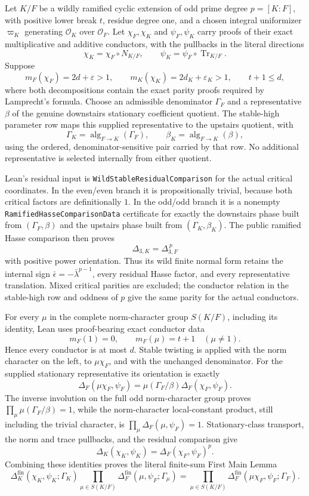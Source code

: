 \begin{theorem}\label{mod:cases-wildstable}
Let $K/F$ be a wildly ramified cyclic extension of odd prime degree
$p=[K:F]$, with positive lower break $t$, residue degree one, and a chosen
integral uniformizer $\varpi_K$ generating $\mathcal O_K$ over
$\mathcal O_F$.  Let $\chi_F,\chi_K$ and $\psi_F,\psi_K$ carry proofs of
their exact multiplicative and additive conductors, with the pullbacks in
the literal directions
\[
 \chi_K=\chi_F\circ N_{K/F},
 \qquad
 \psi_K=\psi_F\circ\operatorname{Tr}_{K/F}.
\]
Suppose
\[
 m_F(\chi_F)=2d+\varepsilon>1,
 \qquad
 m_K(\chi_K)=2d_K+\varepsilon_K>1,
 \qquad
 t+1\leq d,
\]
where both decompositions contain the exact parity proofs required by
Lamprecht's formula.  Choose an admissible denominator $\Gamma_F$ and a
representative $\beta$ of the genuine downstairs stationary coefficient
quotient.  The stable-high parameter row maps this supplied representative
to the upstairs quotient, with
\[
 \Gamma_K=\operatorname{alg}_{F\to K}(\Gamma_F),
 \qquad
 \beta_K=\operatorname{alg}_{F\to K}(\beta),
\]
using the ordered, denominator-sensitive pair carried by that row.  No
additional representative is selected internally from either quotient.

Lean's residual input is
\texttt{WildStableResidualComparison} for the actual critical coordinates.
In the even/even branch it is propositionally trivial, because both critical
factors are definitionally $1$.  In the odd/odd branch it is a nonempty
\texttt{RamifiedHasseComparisonData} certificate for exactly the downstairs
phase built from $(\Gamma_F,\beta)$ and the upstairs phase built from
$(\Gamma_K,\beta_K)$.  The public ramified Hasse comparison then proves
\[
 \Delta_{3,K}=\Delta_{3,F}^{\,p}
\]
with positive power orientation.  Thus its wild finite normal form retains
the internal sign $\bar\epsilon=-\bar\lambda^{p-1}$, every residual Hasse
factor, and every representative translation.  Mixed critical parities are
excluded; the conductor relation in the stable-high row and oddness of $p$
give the same parity for the actual conductors.

For every $\mu$ in the complete norm-character group $S(K/F)$, including
its identity, Lean uses proof-bearing exact conductor data
\[
 m_F(1)=0,
 \qquad
 m_F(\mu)=t+1\quad(\mu\ne1).
\]
Hence every conductor is at most $d$.  Stable twisting is applied with the
norm character on the left, to $\mu\chi_F$, and with the unchanged
denominator.  For the supplied stationary representative its orientation is
exactly
\[
 \Delta_F(\mu\chi_F,\psi_F)
 =\mu(\Gamma_F/\beta)\Delta_F(\chi_F,\psi_F).
\]
The inverse involution on the full odd norm-character group proves
$\prod_\mu\mu(\Gamma_F/\beta)=1$, while the norm-character local-constant
product, still including the trivial character, is
$\prod_\mu\Delta_F(\mu,\psi_F)=1$.  Stationary-class transport, the norm and
trace pullbacks, and the residual comparison give
\[
 \Delta_K(\chi_K,\psi_K)
   =\Delta_F(\chi_F,\psi_F)^p.
\]
Combining these identities proves the literal finite-sum First Main Lemma
\[
 \Delta_K^{\mathrm{fin}}(\chi_K,\psi_K;\Gamma_K)
 \prod_{\mu\in S(K/F)}
   \Delta_F^{\mathrm{fin}}(\mu,\psi_F;\Gamma_\mu)
 =
 \prod_{\mu\in S(K/F)}
   \Delta_F^{\mathrm{fin}}(\mu\chi_F,\psi_F;\Gamma_F).
\]


\end{theorem}
